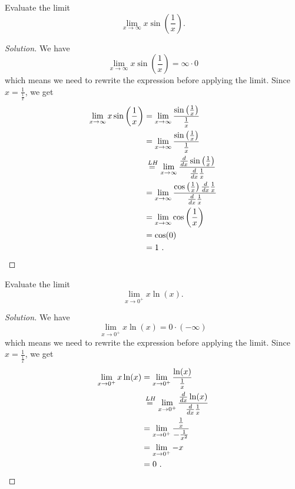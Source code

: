 \documentclass[compacto,10pt,comentarios]{aleph-notas}
\newcommand*\Heq{\ensuremath{\overset{\kern2pt LH}{=}}}
\begin{document}
\begin{ejer}
    Evaluate the limit
    $$
        \lim_{x \to \infty} x \sin \left( \frac{1}{x} \right).
    $$
\end{ejer}
\begin{proof}[Solution]
    We have
    $$
    \lim_{x \to \infty} x \sin \left( \frac{1}{x} \right) = \infty \cdot 0
    $$
    which means we need to rewrite the expression before applying the limit. Since $ x = \frac{1}{\frac{1}{x}}$, we get
    \begin{align*}
        \lim_{x \to \infty} x \sin \left( \frac{1}{x} \right)
        & = \lim_{x \to \infty} \frac{\sin \left( \frac{1}{x} \right) }{\frac{1}{x}} \\
        & = \lim_{x \to \infty} \frac{\sin \left( \frac{1}{x} \right) }{\frac{1}{x}} \\
        & \Heq \lim_{x \to \infty} \frac{ \frac{d}{dx} \sin \left( \frac{1}{x} \right) }{ \frac{d}{dx} \frac{1}{x}} \\
        & = \lim_{x \to \infty} \frac{ \cos \left( \frac{1}{x} \right) \frac{d}{dx} \frac{1}{x} }{ \frac{d}{dx} \frac{1}{x}} \\
        & = \lim_{x \to \infty}\cos \left( \frac{1}{x} \right) \\
        & = \cos(0) \\
        & = 1 ~ .
    \end{align*}
\end{proof}

\begin{ejer}
    Evaluate the limit
    $$
        \lim_{x \to 0^{+}} x \ln(x).
    $$
\end{ejer}
\begin{proof}[Solution]
    We have
    $$
        \lim_{x \to 0^{+}} x \ln(x) = 0 \cdot (-\infty)
    $$
    which means we need to rewrite the expression before applying the limit. Since $ x = \frac{1}{\frac{1}{x}}$, we get
    \begin{align*}
        \lim_{x \to 0^{+}} x \ln(x)
        & = \lim_{x \to 0^{+}} \frac{\ln(x)}{\frac{1}{x}} \\
        & \Heq \lim_{x \to 0^{+}} \frac{\frac{d}{dx} \ln(x)}{\frac{d}{dx} \frac{1}{x}} \\
        & = \lim_{x \to 0^{+}} \frac{\frac{1}{x}}{-\frac{1}{x^2}} \\
        & = \lim_{x \to 0^{+}} -x \\
        & = 0 ~ .
    \end{align*}
\end{proof}
\end{document}
